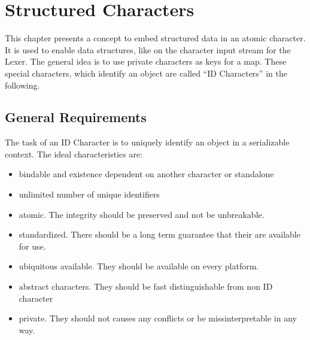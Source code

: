 \chapter{Structured Characters}
This chapter presents a concept to embed structured data in an atomic character. It is used to enable data structures, like  on the character input stream for the Lexer. The general idea is to use private characters as keys for a map. These special characters, which identify an object are called ``ID Characters'' in the following.

\section{General Requirements}
The task of an ID Character is to uniquely identify an object in a serializable context. 
The ideal characteristics are:
\begin{itemize}
	\item bindable and existence dependent on another character or standalone
	\item unlimited number of unique identifiers
	\item atomic. The integrity should be preserved and not be unbreakable.
	\item standardized. There should be a long term guarantee that their are available for use.
	\item ubiquitous available. They should be available on every platform.
	\item abstract characters. They should be fast distinguishable from non ID character
	\item private. They should not causes any conflicts or be missinterpretable in any way.
\end{itemize}

